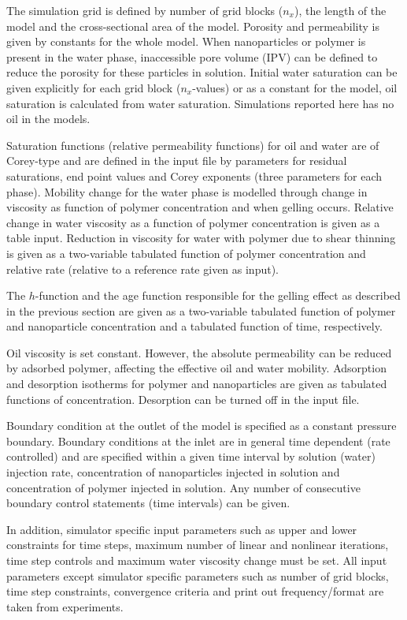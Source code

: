 The simulation grid is defined by number of grid blocks ($n_x$), the length of the model and the cross-sectional area of the model. Porosity and permeability is given by constants for the whole model. When nanoparticles or polymer is present in the water phase, inaccessible pore volume (IPV) can be defined to reduce the porosity for these particles in solution. Initial water saturation can be given explicitly for each grid block ($n_x$-values) or as a constant for the model, oil saturation is calculated from water saturation. Simulations reported here has no oil in the models.

Saturation functions (relative permeability functions) for oil and water are of Corey-type and are defined in the input file by parameters for residual saturations, end point values and Corey exponents (three parameters for each phase). Mobility change for the water phase is modelled through change in viscosity as function of polymer concentration and when gelling occurs. Relative change in water viscosity as a function of polymer concentration is given as a table input. Reduction in viscosity for water with polymer due to shear thinning is given as a two-variable tabulated function of polymer concentration and relative rate (relative to a reference rate given as input).   

The  $h$-function and the  age function responsible for the gelling effect as described in the previous section are given as a two-variable tabulated function of polymer and nanoparticle concentration and a tabulated function of time, respectively. 

Oil viscosity is set constant. However, the absolute permeability can be reduced by adsorbed polymer, affecting the effective oil and water mobility. Adsorption and desorption isotherms for polymer and nanoparticles are given as tabulated functions of concentration. Desorption can be turned off in the input file.

Boundary condition at the outlet of the model is specified as a constant pressure boundary. Boundary conditions at the inlet are in general time dependent (rate controlled) and are specified within a given time interval by solution (water) injection rate, concentration of nanoparticles injected in solution and concentration of polymer injected in solution. Any number of consecutive boundary control statements (time intervals) can be given. 

In addition, simulator specific input parameters such as upper and lower constraints for time steps, maximum number of linear and nonlinear iterations, time step controls and maximum water viscosity change must be set. All input parameters except simulator specific parameters such as number of grid blocks, time step constraints, convergence criteria and print out frequency/format are taken from experiments. 

